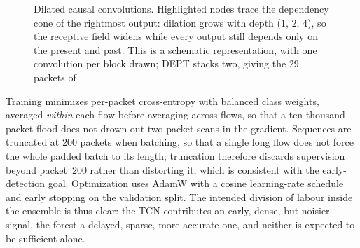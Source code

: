 \begin{figure}[htbp]
    \centering
    \caption[Dilated causal convolutions and the TCN receptive field.]{Dilated causal convolutions. Highlighted nodes trace the dependency cone of the rightmost output: dilation grows with depth ($1$, $2$, $4$), so the receptive field widens while every output still depends only on the present and past. This is a schematic representation, with one convolution per block drawn; DEPT stacks two, giving the $29$ packets of .}
    \label{fig:bg-tcn}
\end{figure}

Training minimizes per-packet cross-entropy with balanced class weights, averaged
\emph{within} each flow before averaging across flows, so that a ten-thousand-packet
flood does not drown out two-packet scans in the gradient. Sequences are truncated at
$200$ packets when batching, so that a single long flow does not force the whole padded
batch to its length; truncation
therefore discards supervision beyond packet~$200$ rather than distorting it, which is
consistent with the early-detection goal. Optimization
uses AdamW with a cosine learning-rate schedule and early stopping on the validation
split.
The intended division of labour inside the ensemble is thus clear: the \ac{TCN}
contributes an early, dense, but noisier signal, the forest a delayed, sparse, more
accurate one, and neither is expected to be sufficient alone.

